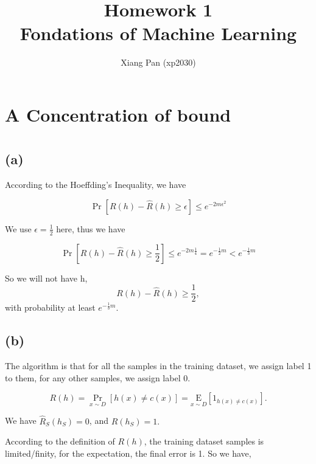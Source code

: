 \documentclass{article}
\title{%
   Homework 1 \\
  \large Fondations of Machine Learning \\}
\author{Xiang Pan (xp2030)}
\begin{document}
\maketitle

\section*{A Concentration of bound}
\section{}
\subsection{(a)}
According to the Hoeffding’s Inequality, we have

\begin{equation}
  \operatorname{Pr}[R(h)-\widehat{R}(h) \geq \epsilon] \leq e^{-2 m \epsilon^{2}}
\end{equation}

We use $\epsilon = \frac{1}{2}$ here, thus we have

\begin{equation}
  \operatorname{Pr}[R(h)-\widehat{R}(h) \geq \frac{1}{2}] \leq e^{-2 m \frac{1}{4}} = e^{-\frac{1}{2}m} < e^{-\frac{1}{3}m}
\end{equation}

So we will not have h,
\begin{equation}
  R(h)-\widehat{R}(h) \geq \frac{1}{2},
\end{equation}
with probability at least $e^{-\frac{1}{3}m}$.

\subsection{(b)}

The algorithm is that for all the samples in the training dataset, we assign label 1 to them, for any other samples, we assign label 0.

\begin{equation}
    R(h)=\operatorname{Pr}_{x \sim D}[h(x) \neq c(x)]=\underset{x \sim D}{\mathrm{E}}\left[1_{h(x) \neq c(x)}\right].
\end{equation}
  
We have $\widehat{R}_{S}\left(h_{S}\right)=0$, and ${R}(h_S)=1.$

According to the definition of $R(h)$, the training dataset samples is limited/finity, for the expectation, the final error is 1. So we have,
\end{document}
